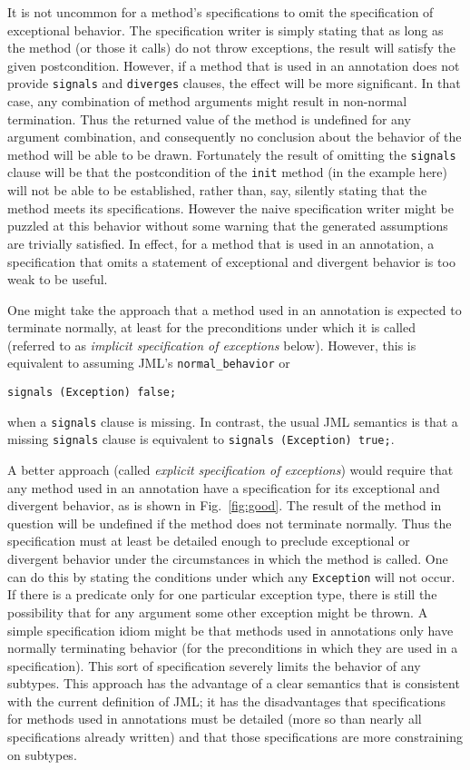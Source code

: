 \documentclass{sig-alternate2}
\begin{document}
It is not uncommon for a method's specifications to omit the specification of exceptional 
behavior.  The specification writer is simply stating that as long as the method (or those it calls)
do not throw exceptions, the result will satisfy the given postcondition.  However, if a method that
is used in an annotation does not provide \texttt{signals} and \texttt{diverges} clauses,
the effect will be more significant.  In that case, any combination of method arguments might
result in non-normal termination.  Thus the returned value of the method is undefined for any
argument combination, and consequently no conclusion about the behavior of the method
will be able to be drawn.
Fortunately the result of omitting the \texttt{signals} clause will be that the postcondition of
the \texttt{init} method (in the example here) 
will not be able to be established, rather than, say, silently stating that the
method meets its specifications.  However the naive specification writer might be puzzled at
this behavior without some warning that the generated assumptions are trivially satisfied.
In effect, for a method that is used in an annotation, a specification that omits a statement of
exceptional and divergent behavior is too weak to be useful.  

One might take the approach that a method used in an annotation is expected to 
terminate normally, at least for the preconditions under which it is called (referred to as 
{\it implicit specification of exceptions} below).  However, this is
equivalent to assuming JML's \texttt{normal\_behavior} or 
\begin{center} \texttt{signals (Exception) false;}\end{center}
when a \texttt{signals} clause is missing.  
In contrast, the usual JML semantics is that a missing \texttt{signals} clause is
equivalent to \texttt{signals (Exception) true;}.

A better approach (called {\it explicit specification of exceptions}) would require that any method used in an annotation
have a specification for its exceptional and divergent behavior, as is shown
in Fig.~\ref{fig:good}.  The result of the method in question will be undefined if
the method does not terminate normally.  Thus the specification must at least be detailed
enough to preclude exceptional or divergent behavior under the circumstances in which the
method is called.   One can do this by stating the conditions under which any  \texttt{Exception} will
not occur.  If there is 
a predicate only for one particular exception type, there is still the possibility that for any argument
some other exception might be thrown.  A simple specification idiom might be that methods used
in annotations only have normally terminating behavior (for the preconditions in which they are 
used in a specification).  This sort of specification severely limits the behavior of 
any subtypes.   
This approach has the advantage of a clear semantics that is consistent with the current 
definition of JML; it has the disadvantages that
specifications for methods used in annotations must be detailed (more so than nearly all specifications already written) and that
those specifications are more constraining on subtypes.  
\end{document}
